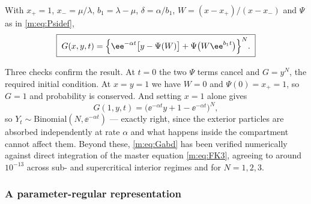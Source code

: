 \begin{proposition}
\label{m:prop:Gabd}
With $x_+=1$, $x_-=\mu/\lambda$, $b_1 = \lambda-\mu$, $\delta = \alpha/b_1$,
$W = (x-x_+)/(x-x_-)$ and $\Psi$ as in \cref{m:eq:Psidef},
\begin{equation}
\label{m:eq:Gabd}
\boxed{\;
G(x,y,t) = \Bigl\{\ee^{-\alpha t}\bigl[y-\Psi(W)\bigr] + \Psi\bigl(W\ee^{b_1t}\bigr)\Bigr\}^{N}. \;}
\end{equation}
\end{proposition}

Three checks confirm the result. At $t=0$ the two $\Psi$ terms cancel and $G=y^N$,
the required initial condition. At $x=y=1$ we have $W=0$ and $\Psi(0)=x_+=1$, so
$G=1$ and probability is conserved. And setting $x=1$ alone gives
\begin{equation*}
G(1,y,t) = \bigl(\ee^{-\alpha t}y + 1-\ee^{-\alpha t}\bigr)^N,
\end{equation*}
so $Y_t\sim\text{Binomial}(N,\ee^{-\alpha t})$ --- exactly right, since the
exterior particles are absorbed independently at rate $\alpha$ and what happens
inside the compartment cannot affect them. Beyond these, \cref{m:eq:Gabd} has been
verified numerically against direct integration of the master equation
\cref{m:eq:FK3}, agreeing to around $10^{-13}$ across sub- and supercritical interior
regimes and for $N=1,2,3$.

\subsubsection*{A parameter-regular representation}

